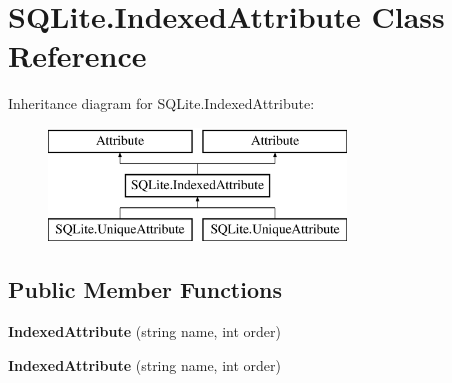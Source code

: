 \hypertarget{classSQLite_1_1IndexedAttribute}{\section{S\-Q\-Lite.\-Indexed\-Attribute Class Reference}
\label{classSQLite_1_1IndexedAttribute}
}
Inheritance diagram for S\-Q\-Lite.\-Indexed\-Attribute\-:\begin{figure}[H]
\begin{center}
\leavevmode
\includegraphics[height=3.000000cm]{classSQLite_1_1IndexedAttribute}
\end{center}
\end{figure}
\subsection*{Public Member Functions}
\begin{DoxyCompactItemize}
\item 
\hypertarget{classSQLite_1_1IndexedAttribute_a6d43155fc211d6c76d27326c66c39752}{{\bfseries Indexed\-Attribute} (string name, int order)}\label{classSQLite_1_1IndexedAttribute_a6d43155fc211d6c76d27326c66c39752}

\item 
\hypertarget{classSQLite_1_1IndexedAttribute_a6d43155fc211d6c76d27326c66c39752}{{\bfseries Indexed\-Attribute} (string name, int order)}\label{classSQLite_1_1IndexedAttribute_a6d43155fc211d6c76d27326c66c39752}

\end{DoxyCompactItemize}
